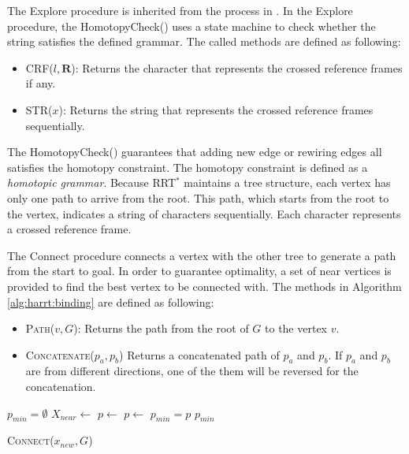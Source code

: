\documentclass[letterpaper, 10 pt, conference]{ieeeconf}
\begin{document}
The {\sc Explore} procedure is inherited from the process in \cite{Karaman-RSS-10}.
In the {\sc Explore} procedure, the {\sc HomotopyCheck}() uses a state machine to check whether the string satisfies the defined grammar.
The called methods are defined as following:
\begin{itemize}
	\item \textsc{CRF}($ l, \bm{R} $):
	Returns the character that represents the crossed reference frames if any.
	\item \textsc{STR}($ x $):	
	Returns the string that represents the crossed reference frames sequentially.
\end{itemize}

The {\sc HomotopyCheck}() guarantees that adding new edge or rewiring edges all satisfies the homotopy constraint.
The homotopy constraint is defined as a \emph{homotopic grammar}.
Because RRT$^{*}$ maintains a tree structure, each vertex has only one path to arrive from the root.
This path, which starts from the root to the vertex, indicates a string of characters sequentially.
Each character represents a crossed reference frame.

The {\sc Connect} procedure connects a vertex with the other tree to generate a path from the start to goal.
In order to guarantee optimality, a set of near vertices is provided to find the best vertex to be connected with.
The methods in Algorithm \ref{alg:harrt:binding} are defined as following:
\begin{itemize}
	\item \textsc{Path}($ v, G $):	
	Returns the path from the root of $ G $ to the vertex $ v $.
	\item \textsc{Concatenate}{($ p_{a}, p_{b} $)}
	Returns a concatenated path of $ p_{a} $ and $  p_{b} $.
	If $ p_{a} $ and $  p_{b} $ are from different directions, one of the them will be reversed for the concatenation.
\end{itemize}

\begin{algorithm}[hbtp]
	\begin{algorithmic}[1]
		\State $ p_{min} = \emptyset $
		\State $ X_{near} \leftarrow $ 
					\State $ p \leftarrow $ 
				\Else
				    \State $ p \leftarrow $ 			
				\EndIf
			    	\State $ p_{min} = p $
			    \EndIf 
			\EndIf
		\EndFor
		\Return $ p_{min} $
	\end{algorithmic}
	\caption{ \textsc{Connect}($ x_{new}, G $) }
	\label{alg:harrt:binding}
\end{algorithm}
\end{document}
